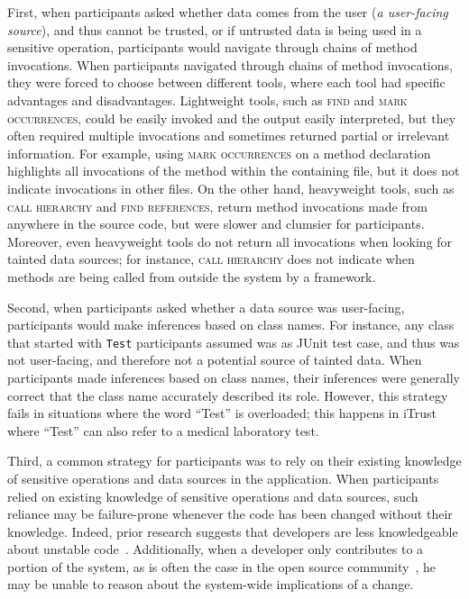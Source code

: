 \documentclass[10pt,journal,compsoc]{IEEEtran}
\begin{document}
First, when participants asked whether data comes from the user (\emph{a user-facing source}), 
and thus cannot be trusted, or if untrusted data is being used in a sensitive operation,
participants would navigate through chains of method invocations.
When participants navigated through chains of method invocations,
they were forced to choose between different tools, where each tool
had specific advantages and disadvantages.
Lightweight tools, such as \textsc{find} and \textsc{mark occurrences}, could be easily invoked and the output
easily interpreted, but they often required multiple invocations and sometimes returned 
partial or irrelevant information.
For example, using \textsc{mark occurrences} on a method declaration highlights all invocations of the method 
within the containing file, but it does not indicate invocations in other files.
On the other hand, heavyweight tools, such as \textsc{call hierarchy} and \textsc{find references}, 
return method invocations made from anywhere in the source code, but were slower and clumsier for participants.
Moreover, even heavyweight tools do not return all invocations when looking for tainted data sources;
for instance, \textsc{call hierarchy} does not indicate when methods are being called from outside the system
by a framework.

Second, when participants asked whether a data source was user-facing,
participants would make inferences based on class names.
For instance, any class that started with \texttt{Test} participants assumed was as JUnit test case,
and thus was not user-facing, and therefore not a potential source of tainted data.
When participants made inferences based on class names,
their inferences were generally correct that the class name accurately described
its role.
However, this strategy
fails in situations where the word ``Test'' is overloaded;
this happens in iTrust where ``Test'' can also refer to 
a medical laboratory test.

Third, a common strategy for
participants was to rely on their existing knowledge of sensitive operations and data sources in the application.
When participants relied on existing knowledge of sensitive operations and data sources,
such reliance may be failure-prone whenever the code has been changed without their knowledge.
Indeed, prior research suggests that developers are 
less knowledgeable about unstable code~\cite{fritz2014degree}. 
Additionally, when a developer only contributes to a portion of the system, as is often the case in the open source community~\cite{mockus2002open}, he may be unable to reason about the system-wide implications of a change. 
\end{document}
